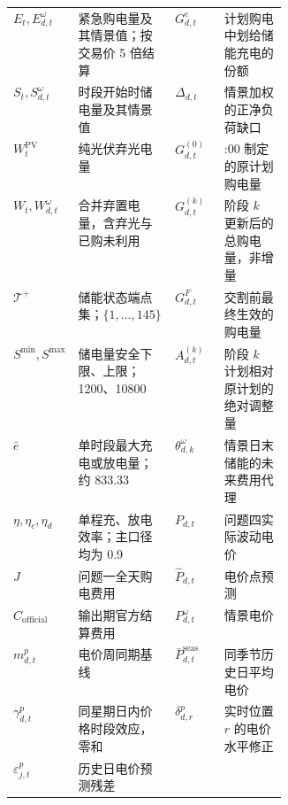 \begin{tabularx}{\linewidth}{@{}
  >{\centering\arraybackslash}m{0.18\linewidth}
  >{\centering\arraybackslash}X|
  >{\centering\arraybackslash}m{0.18\linewidth}
  >{\centering\arraybackslash}X@{}}
$E_t,E^\omega_{d,t}$ & 紧急购电量及其情景值；按交易价 5 倍结算 & $G^{\mathrm c}_{d,t}$ & 计划购电中划给储能充电的份额 \\
$S_t,S^\omega_{d,t}$ & 时段开始时储电量及其情景值 & $\Delta_{d,t}$ & 情景加权的正净负荷缺口 \\
$W_t^{\mathrm{PV}}$ & 纯光伏弃光电量 & $G^{(0)}_{d,t}$ & 0:00 制定的原计划购电量 \\
$W_t,W^\omega_{d,t}$ & 合并弃置电量，含弃光与已购未利用 & $G^{(k)}_{d,t}$ & 阶段 $k$ 更新后的总购电量，非增量 \\
$\mathcal T^+$ & 储能状态端点集；$\{1,\ldots,145\}$ & $G^F_{d,t}$ & 交割前最终生效的购电量 \\
$S^{\min},S^{\max}$ & 储电量安全下限、上限；1200、10800 & $A^{(k)}_{d,t}$ & 阶段 $k$ 计划相对原计划的绝对调整量 \\
$\bar e$ & 单时段最大充电或放电量；约 833.33 & $\theta^\omega_{d,k}$ & 情景日末储能的未来费用代理 \\
$\eta,\eta_c,\eta_d$ & 单程充、放电效率；主口径均为 0.9 & $P_{d,t}$ & 问题四实际波动电价 \\
$J$ & 问题一全天购电费用 & $\widehat P_{d,t}$ & 电价点预测 \\
$C_{\mathrm{official}}$ & 输出期官方结算费用 & $P^\omega_{d,t}$ & 情景电价 \\
$m^p_{d,t}$ & 电价周同期基线 & $\bar P^{\mathrm{seas}}_{d,t}$ & 同季节历史日平均电价 \\
$\gamma^p_{d,t}$ & 同星期日内价格时段效应，零和 & $\delta^p_{d,r}$ & 实时位置 $r$ 的电价水平修正 \\
$\varepsilon^p_{j,t}$ & 历史日电价预测残差 &  &  \\
\bottomrule[0.8pt]
\end{tabularx}
\par
\endgroup
